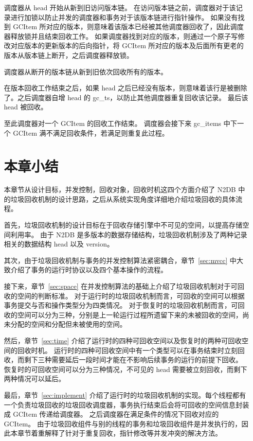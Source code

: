调度器从 head 开始从新到旧访问版本链。
在访问版本链之前，调度器对于该记录进行加锁以防止并发的调度器和事务对于该版本链进行指针操作。
如果没有找到 GCItem 所对应的版本，则意味着该版本已经被其他调度器回收了，因此调度器释放锁并且结束回收工作。
如果调度器找到对应的版本，则通过一个原子写修改对应版本的更新版本的后向指针，将 GCItem 所对应的版本及后面所有更老的版本从版本链上断开，之后调度器释放锁。

调度器从断开的版本链从新到旧依次回收所有的版本。

在版本回收工作结束之后，如果 head 之后已经没有版本，则意味着该行是被删除了。之后调度器自增 head 的 gc\_ts，以防止其他调度器重复回收该记录。
最后该 head 被回收。

至此调度器对一个 GCItem 的回收工作结束。
调度器会接下来 gc\_items 中下一个 GCItem 满不满足回收条件，若满足则重复此过程。


\section{本章小结}

本章节从设计目标，并发控制，回收对象，回收时机这四个方面介绍了 N2DB 中的垃圾回收机制的设计思路，之后从系统实现角度详细地介绍垃圾回收的具体流程。

首先，垃圾回收机制的设计目标在于回收存储引擎中不可见的空间，以提高存储空间利用率。
由于 N2DB 是多版本的数据存储结构，垃圾回收机制涉及了两种记录相关的数据结构 head 以及 version。

其次，由于垃圾回收机制与事务的并发控制算法紧密耦合，章节~\ref{sec:mvcc} 中大致介绍了事务的运行时协议以及四个基本操作的流程。

接下来，章节~\ref{sec:space} 在并发控制算法的基础上介绍了垃圾回收机制对于可回收的空间的判断标准。
对于运行时的垃圾回收机制而言，可回收的空间可以根据事务提交与否和操作类型分为四类情况。
对于恢复时的垃圾回收机制而言，可回收的空间可以分为三种，分别是上一轮运行过程所遗留下来的未被回收的空间，尚未分配的空间和分配但未被使用的空间。

然后，章节~\ref{sec:time} 介绍了运行时的四种可回收空间以及恢复时的两种可回收空间的回收时机。
运行时的四种可回收空间中有一个类型可以在事务结束时立刻回收，而剩下三种需要延后一段时间才能在不影响后续事务的运行的前提下回收。
恢复时的可回收空间可以分为三种情况，不可见的 head 需要被立刻回收，而剩下两种情况可以延后。

最后，章节~\ref{sec:implement} 介绍了运行时的垃圾回收机制的实现。每个线程都有一个负责垃圾回收的垃圾回收调度器，事务执行结束后会将可回收的空间信息封装成 GCItem 传递给调度器。
之后调度器在满足条件的情况下回收对应的 GCItem。
由于垃圾回收组件与别的线程的事务和垃圾回收组件是并发执行的，因此本章节着重解释了针对于重复回收，指针修改等并发冲突的解决方法。
